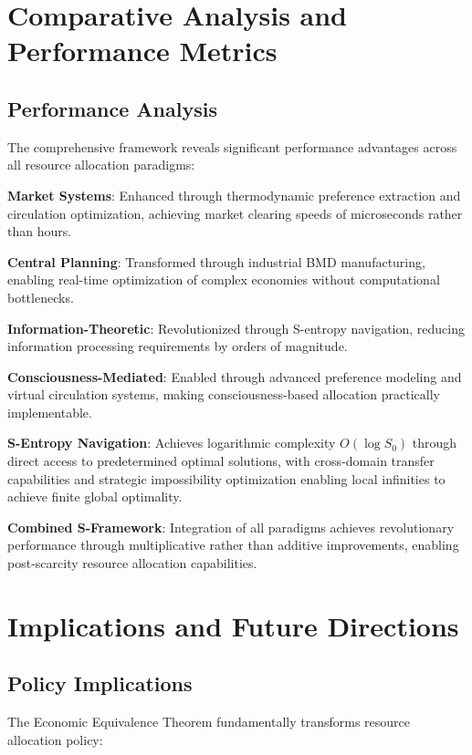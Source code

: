 \documentclass[12pt,a4paper]{article}
\begin{document}
\section{Comparative Analysis and Performance Metrics}

\subsection{Performance Analysis}

The comprehensive framework reveals significant performance advantages across all resource allocation paradigms:

\textbf{Market Systems}: Enhanced through thermodynamic preference extraction and circulation optimization, achieving market clearing speeds of microseconds rather than hours.

\textbf{Central Planning}: Transformed through industrial BMD manufacturing, enabling real-time optimization of complex economies without computational bottlenecks.

\textbf{Information-Theoretic}: Revolutionized through S-entropy navigation, reducing information processing requirements by orders of magnitude.

\textbf{Consciousness-Mediated}: Enabled through advanced preference modeling and virtual circulation systems, making consciousness-based allocation practically implementable.

\textbf{S-Entropy Navigation}: Achieves logarithmic complexity $O(\log S_0)$ through direct access to predetermined optimal solutions, with cross-domain transfer capabilities and strategic impossibility optimization enabling local infinities to achieve finite global optimality.

\textbf{Combined S-Framework}: Integration of all paradigms achieves revolutionary performance through multiplicative rather than additive improvements, enabling post-scarcity resource allocation capabilities.

\section{Implications and Future Directions}

\subsection{Policy Implications}

The Economic Equivalence Theorem fundamentally transforms resource allocation policy:
\end{document}
